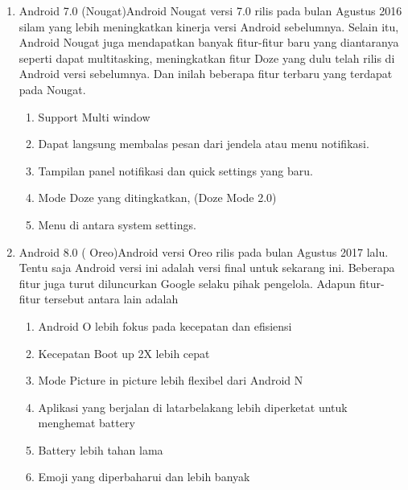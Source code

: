 \begin{enumerate}
\item Android 7.0 (Nougat)Android Nougat versi 7.0 rilis pada bulan Agustus 2016 silam yang lebih meningkatkan kinerja versi Android sebelumnya. Selain itu, Android Nougat juga mendapatkan banyak fitur-fitur baru yang diantaranya seperti dapat multitasking,  meningkatkan fitur Doze yang dulu telah rilis di Android versi sebelumnya.
Dan inilah beberapa fitur terbaru yang terdapat pada Nougat.
\begin{enumerate}
\item Support Multi window
\item Dapat langsung membalas pesan dari jendela atau menu notifikasi.
\item Tampilan panel notifikasi dan quick settings yang baru.
\item Mode Doze yang ditingkatkan, (Doze Mode 2.0)
\item Menu di antara system settings.
\end{enumerate}
\item Android 8.0 ( Oreo)Android versi Oreo rilis pada bulan Agustus 2017 lalu. Tentu saja Android versi ini adalah versi final untuk sekarang ini. Beberapa fitur juga turut diluncurkan Google selaku pihak pengelola. Adapun fitur-fitur tersebut antara lain adalah
\begin{enumerate}
\item Android O lebih fokus pada kecepatan dan efisiensi
\item Kecepatan Boot up 2X lebih cepat
\item Mode Picture in picture lebih flexibel dari Android N
\item Aplikasi yang berjalan di latarbelakang lebih diperketat untuk menghemat battery
\item Battery lebih tahan lama
\item Emoji yang diperbaharui dan lebih banyak
\end{enumerate}

\end{enumerate}
